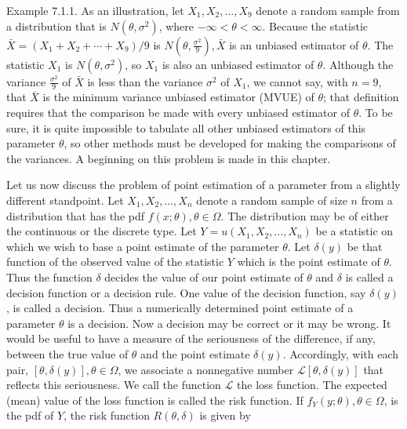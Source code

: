 Example 7.1.1. As an illustration, let $X_{1}, X_{2}, \ldots, X_{9}$ denote a random sample from a distribution that is $N\left(\theta, \sigma^{2}\right)$, where $-\infty<\theta<\infty$. Because the statistic\\
$\bar{X}=\left(X_{1}+X_{2}+\cdots+X_{9}\right) / 9$ is $N\left(\theta, \frac{\sigma^{2}}{9}\right), \bar{X}$ is an unbiased estimator of $\theta$. The statistic $X_{1}$ is $N\left(\theta, \sigma^{2}\right)$, so $X_{1}$ is also an unbiased estimator of $\theta$. Although the variance $\frac{\sigma^{2}}{9}$ of $\bar{X}$ is less than the variance $\sigma^{2}$ of $X_{1}$, we cannot say, with $n=9$, that $\bar{X}$ is the minimum variance unbiased estimator (MVUE) of $\theta$; that definition requires that the comparison be made with every unbiased estimator of $\theta$. To be sure, it is quite impossible to tabulate all other unbiased estimators of this parameter $\theta$, so other methods must be developed for making the comparisons of the variances. A beginning on this problem is made in this chapter.

Let us now discuss the problem of point estimation of a parameter from a slightly different standpoint. Let $X_{1}, X_{2}, \ldots, X_{n}$ denote a random sample of size $n$ from a distribution that has the pdf $f(x ; \theta), \theta \in \Omega$. The distribution may be of either the continuous or the discrete type. Let $Y=u\left(X_{1}, X_{2}, \ldots, X_{n}\right)$ be a statistic on which we wish to base a point estimate of the parameter $\theta$. Let $\delta(y)$ be that function of the observed value of the statistic $Y$ which is the point estimate of $\theta$. Thus the function $\delta$ decides the value of our point estimate of $\theta$ and $\delta$ is called a decision function or a decision rule. One value of the decision function, say $\delta(y)$, is called a decision. Thus a numerically determined point estimate of a parameter $\theta$ is a decision. Now a decision may be correct or it may be wrong. It would be useful to have a measure of the seriousness of the difference, if any, between the true value of $\theta$ and the point estimate $\delta(y)$. Accordingly, with each pair, $[\theta, \delta(y)], \theta \in \Omega$, we associate a nonnegative number $\mathcal{L}[\theta, \delta(y)]$ that reflects this seriousness. We call the function $\mathcal{L}$ the loss function. The expected (mean) value of the loss function is called the risk function. If $f_{Y}(y ; \theta), \theta \in \Omega$, is the pdf of $Y$, the risk function $R(\theta, \delta)$ is given by

